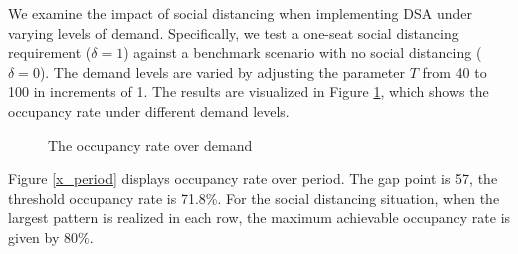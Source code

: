 We examine the impact of social distancing when implementing DSA under varying levels of demand.  Specifically, we test a one-seat social distancing requirement ($\delta = 1$) against a benchmark scenario with no social distancing ($\delta =0$). The demand levels are varied by adjusting the parameter $T$ from 40 to 100 in increments of 1. The results are visualized in Figure \ref{occupancy_rate_demand}, which shows the occupancy rate under different demand levels.





\begin{figure}[h]
  \centering
  \caption{The occupancy rate over demand}
  \label{occupancy_rate_demand}
\end{figure}

Figure \ref{x_period} displays occupancy rate over period. The gap point is 57, the threshold occupancy rate is 71.8\%. For the social distancing situation, when the largest pattern is realized in each row, the maximum achievable occupancy rate is given by $80\%$.

